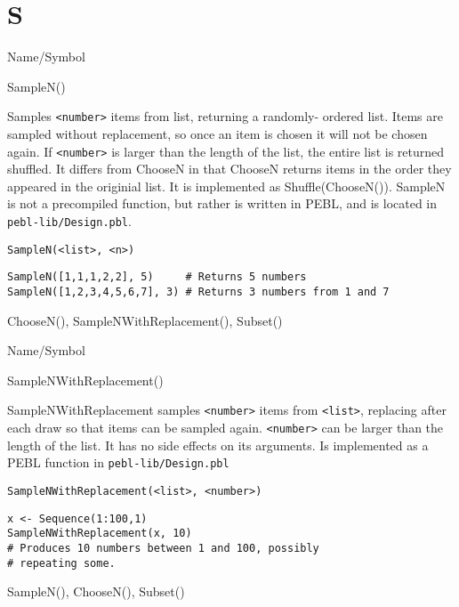 \rl
\section{S}
\rl

\begin{desc}{Name/Symbol}
\item[Name/Symbol]  	SampleN()

\item[Description] 	Samples \verb+<number>+ items from list, returning a randomly-
		ordered list. Items are sampled without replacement, so once
an item is chosen it will not be chosen again. If \verb+<number>+ is larger than the length of the list, the entire list is returned shuffled.  It differs from ChooseN in that ChooseN returns items in the order they appeared in the originial list.  It is implemented as Shuffle(ChooseN()).  SampleN is not a precompiled function, but rather is written in PEBL, and is located in \texttt{pebl-lib/Design.pbl}.

\item[Usage]       	
\begin{verbatim}
SampleN(<list>, <n>)
\end{verbatim}

\item[Example]   	
\begin{verbatim}
SampleN([1,1,1,2,2], 5)     # Returns 5 numbers
SampleN([1,2,3,4,5,6,7], 3) # Returns 3 numbers from 1 and 7
\end{verbatim}

\item[See Also]    	ChooseN(), SampleNWithReplacement(), Subset()
\end{desc}

\rl


\begin{desc}{Name/Symbol}
\item[Name/Symbol] 	SampleNWithReplacement()

\item[Description] 	SampleNWithReplacement samples \verb+<number>+ items from \verb+<list>+, 
		replacing after each draw so that items can be sampled again. 
		\verb+<number>+ can be larger than the length of the list. It has no 
		side effects on its arguments.  
		Is implemented as a PEBL function in \texttt{pebl-lib/Design.pbl}

\item[Usage]        	
\begin{verbatim}
SampleNWithReplacement(<list>, <number>)
\end{verbatim}

\item[Example] 	
\begin{verbatim}
x <- Sequence(1:100,1)
SampleNWithReplacement(x, 10)
# Produces 10 numbers between 1 and 100, possibly 
# repeating some.
\end{verbatim}

\item[See Also]     	SampleN(), ChooseN(), Subset()
\end{desc}

